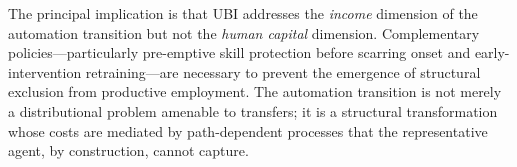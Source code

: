 \documentclass[12pt,a4paper]{article}
\begin{document}
The principal implication is that UBI addresses the \emph{income}
dimension of the automation transition but not the \emph{human capital}
dimension. Complementary policies---particularly pre-emptive skill
protection before scarring onset and early-intervention retraining---are
necessary to prevent the emergence of structural exclusion from
productive employment. The automation transition is not merely a
distributional problem amenable to transfers; it is a structural
transformation whose costs are mediated by path-dependent processes that
the representative agent, by construction, cannot capture.

\printbibliography
\end{document}
